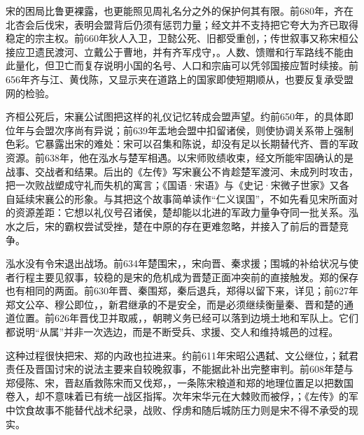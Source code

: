宋的困局比鲁更裸露，也更能照见周礼名分之外的保护何其有限。前680年，齐在北杏会后伐宋，表明会盟背后仍须有惩罚力量；经文并不支持把它夸大为齐已取得稳定的宗主权。前660年狄人入卫，卫懿公死、旧都受重创，；传世叙事又称宋桓公接应卫遗民渡河、立戴公于曹地，并有齐军戍守，。人数、馈赠和行军路线不能由此量化，但卫亡而复存说明小国的名号、人口和宗庙可以凭邻国接应暂时续接。前656年齐与江、黄伐陈，又显示夹在道路上的国家即使短期顺从，也要反复承受盟网的检验。

齐桓公死后，宋襄公试图把这样的礼仪记忆转成会盟声望。约前650年，的具体即位年与会盟次序尚有异说；前639年盂地会盟中扣留诸侯，则使协调关系带上强制色彩。它暴露出宋的难处：宋可以召集和陈说，却没有足以长期替代齐、晋的军政资源。前638年，他在泓水与楚军相遇。以宋师败绩收束，经文所能牢固确认的是战事、交战者和结果。后出的《左传》写宋襄公不肯趁楚军渡河、未成列时攻击，把一次败战塑成守礼而失机的寓言；《国语·宋语》与《史记·宋微子世家》又各自延续宋襄公的形象。与其把这个故事简单读作“仁义误国”，不如先看见宋所面对的资源差距：它想以礼仪号召诸侯，楚却能以北进的军政力量争夺同一批关系。泓水之后，宋的霸权尝试受挫，楚在中原的存在更难忽略，并接入了前后的晋楚竞争。

泓水没有令宋退出战场。前634年楚围宋，，宋向晋、秦求援；围城的补给状况与使者行程主要见叙事，较稳的是宋的危机成为晋楚正面冲突前的直接触发。郑的保存也有相同的两面。前630年晋、秦围郑，秦后退兵，郑得以留下来，详见；前627年郑文公卒、穆公即位，，新君继承的不是安全，而是必须继续衡量秦、晋和楚的通道位置。前626年晋伐卫并取戚，，朝聘义务已经可以落到边境土地和军队上。它们都说明“从属”并非一次选边，而是不断受兵、求援、交人和维持城邑的过程。

这种过程很快把宋、郑的内政也拉进来。约前611年宋昭公遇弑、文公继位，；弑君责任及晋国讨宋的说法主要来自较晚叙事，不能据此补出完整审判。前608年楚与郑侵陈、宋，晋赵盾救陈宋而又伐郑，，一条陈宋粮道和郑的地理位置足以把数国卷入，却不意味着已有统一战区指挥。次年宋华元在大棘败而被俘，；《左传》的军中饮食故事不能替代战术纪录，战败、俘虏和随后城防压力则是宋不得不承受的现实。

